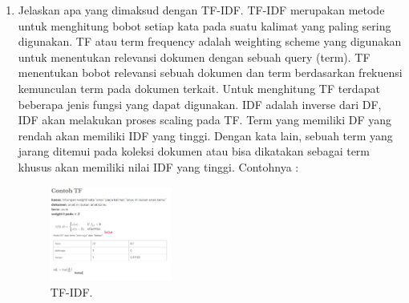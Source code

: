 \begin{enumerate}
	\item Jelaskan apa yang dimaksud dengan TF-IDF.
	\hfill\break
	TF-IDF merupakan metode untuk menghitung bobot setiap kata pada suatu kalimat yang paling sering digunakan. TF atau term frequency adalah weighting scheme yang digunakan untuk menentukan relevansi dokumen dengan sebuah query (term). TF menentukan bobot relevansi sebuah dokumen dan term berdasarkan frekuensi kemunculan term pada dokumen terkait. Untuk menghitung TF terdapat beberapa jenis fungsi yang dapat digunakan. IDF adalah inverse dari DF, IDF akan melakukan proses scaling pada TF. Term yang memiliki DF yang rendah akan memiliki IDF yang tinggi. Dengan kata lain, sebuah term yang jarang ditemui pada koleksi dokumen atau bisa dikatakan sebagai term khusus akan memiliki nilai IDF yang tinggi. Contohnya :

	\begin{figure}[H]
	\centering
		\includegraphics[width=4cm]{figures/1174080/4/5.PNG}
		\caption{TF-IDF.}
	\end{figure}
\end{enumerate}


